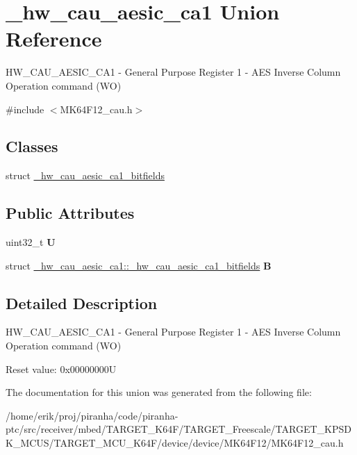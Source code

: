 \hypertarget{union__hw__cau__aesic__ca1}{}\section{\+\_\+hw\+\_\+cau\+\_\+aesic\+\_\+ca1 Union Reference}
\label{union__hw__cau__aesic__ca1}


H\+W\+\_\+\+C\+A\+U\+\_\+\+A\+E\+S\+I\+C\+\_\+\+C\+A1 -\/ General Purpose Register 1 -\/ A\+ES Inverse Column Operation command (WO)  




{\ttfamily \#include $<$M\+K64\+F12\+\_\+cau.\+h$>$}

\subsection*{Classes}
\begin{DoxyCompactItemize}
\item 
struct \hyperlink{struct__hw__cau__aesic__ca1_1_1__hw__cau__aesic__ca1__bitfields}{\+\_\+hw\+\_\+cau\+\_\+aesic\+\_\+ca1\+\_\+bitfields}
\end{DoxyCompactItemize}
\subsection*{Public Attributes}
\begin{DoxyCompactItemize}
\item 
uint32\+\_\+t {\bfseries U}\hypertarget{union__hw__cau__aesic__ca1_aecda1eb4de0bddfe73c7db73f32bea3c}{}\label{union__hw__cau__aesic__ca1_aecda1eb4de0bddfe73c7db73f32bea3c}

\item 
struct \hyperlink{struct__hw__cau__aesic__ca1_1_1__hw__cau__aesic__ca1__bitfields}{\+\_\+hw\+\_\+cau\+\_\+aesic\+\_\+ca1\+::\+\_\+hw\+\_\+cau\+\_\+aesic\+\_\+ca1\+\_\+bitfields} {\bfseries B}\hypertarget{union__hw__cau__aesic__ca1_a72dccae6f5d74a8cb93e8c4827d65a6b}{}\label{union__hw__cau__aesic__ca1_a72dccae6f5d74a8cb93e8c4827d65a6b}

\end{DoxyCompactItemize}


\subsection{Detailed Description}
H\+W\+\_\+\+C\+A\+U\+\_\+\+A\+E\+S\+I\+C\+\_\+\+C\+A1 -\/ General Purpose Register 1 -\/ A\+ES Inverse Column Operation command (WO) 

Reset value\+: 0x00000000U 

The documentation for this union was generated from the following file\+:\begin{DoxyCompactItemize}
\item 
/home/erik/proj/piranha/code/piranha-\/ptc/src/receiver/mbed/\+T\+A\+R\+G\+E\+T\+\_\+\+K64\+F/\+T\+A\+R\+G\+E\+T\+\_\+\+Freescale/\+T\+A\+R\+G\+E\+T\+\_\+\+K\+P\+S\+D\+K\+\_\+\+M\+C\+U\+S/\+T\+A\+R\+G\+E\+T\+\_\+\+M\+C\+U\+\_\+\+K64\+F/device/device/\+M\+K64\+F12/M\+K64\+F12\+\_\+cau.\+h\end{DoxyCompactItemize}
